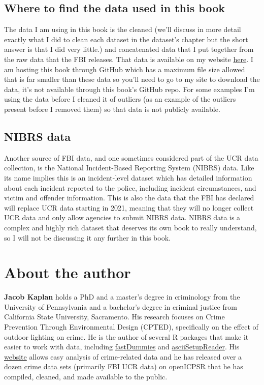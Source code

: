 \documentclass[
  12pt,
  openany]{book}
\begin{document}
\hypertarget{where-to-find-the-data-used-in-this-book}{%
\section*{Where to find the data used in this book}\label{where-to-find-the-data-used-in-this-book}}


The data I am using in this book is the cleaned (we'll discuss in more detail exactly what I did to clean each dataset in the dataset's chapter but the short answer is that I did very little.) and concatenated data that I put together from the raw data that the FBI releases. That data is available on my website \href{https://jacobdkaplan.com/data.html}{here}. I am hosting this book through GitHub which has a maximum file size allowed that is far smaller than these data so you'll need to go to my site to download the data, it's not available through this book's GitHub repo. For some examples I'm using the data before I cleaned it of outliers (as an example of the outliers present before I removed them) so that data is not publicly available.

\hypertarget{nibrs-data}{%
\section*{NIBRS data}\label{nibrs-data}}


Another source of FBI data, and one sometimes considered part of the UCR data collection, is the National Incident-Based Reporting System (NIBRS) data. Like its name implies this is an incident-level dataset which has detailed information about each incident reported to the police, including incident circumstances, and victim and offender information. This is also the data that the FBI has declared will replace UCR data starting in 2021, meaning that they will no longer collect UCR data and only allow agencies to submit NIBRS data. NIBRS data is a complex and highly rich dataset that deserves its own book to really understand, so I will not be discussing it any further in this book.

\hypertarget{about-the-author}{%
\chapter*{About the author}\label{about-the-author}}


\textbf{Jacob Kaplan} holds a PhD and a master's degree in criminology from the University of Pennsylvania and a bachelor's degree in criminal justice from California State University, Sacramento. His research focuses on Crime Prevention Through Environmental Design (CPTED), specifically on the effect of outdoor lighting on crime. He is the author of several R packages that make it easier to work with data, including \href{https://jacobkap.github.io/fastDummies/}{fastDummies} and \href{https://jacobkap.github.io/asciiSetupReader/}{asciiSetupReader}. His \href{http://jacobdkaplan.com/}{website} allows easy analysis of crime-related data and he has released over a \href{http://jacobdkaplan.com/data.html}{dozen crime data sets} (primarily FBI UCR data) on openICPSR that he has compiled, cleaned, and made available to the public.
\end{document}
